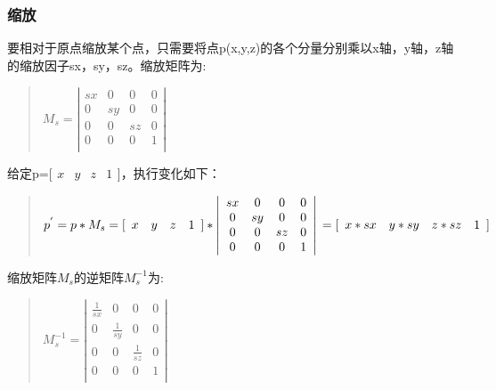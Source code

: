 \documentclass[a4paper,10pt]{article}
\begin{document}
\begin{CJK}{UTF8}{song}
\subsubsection{缩放}
要相对于原点缩放某个点，只需要将点p(x,y,z)的各个分量分别乘以x轴，y轴，z轴的缩放因子sx，sy，sz。缩放矩阵为:
\begin{quote}
\begin{math}
M_{s}=\left|
\begin{array}{cccc}
sx & 0 & 0 & 0 \\
0 & sy & 0 & 0 \\
0 & 0 & sz & 0 \\
0 & 0 & 0 & 1  \\
\end{array}
\right|
\end{math}
\end{quote}
给定p=[$\begin{array}{cccc}x & y & z& 1\end{array}$]，执行变化如下：
\begin{quote}
\begin{math}
p^{'}=p*M_{s}=[\begin{array}{cccc} x & y & z & 1 \end{array} ]* 
\left|
\begin{array}{cccc}
sx & 0 & 0 & 0 \\
0 & sy & 0 & 0 \\
0 & 0 & sz & 0 \\
0 & 0 & 0  & 1 \\
\end{array}
\right| \\
=[\begin{array}{cccc} x*sx & y* sy & z*sz & 1 \end{array} ]
\end{math}
\end{quote}
缩放矩阵$M_{s}$的逆矩阵$M_{s}^{-1}$为:
\begin{quote}
\begin{math}
M_{s}^{-1}=\left|
\begin{array}{cccc}
\frac{1}{sx} & 0 & 0 & 0 \\
0 & \frac{1}{sy} & 0 & 0 \\
0 & 0 & \frac{1}{sz} & 0 \\
0 & 0 & 0 & 1 \\
\end{array}
\right| 
\end{math}
\end{quote}

\end{CJK}
\end{document}
